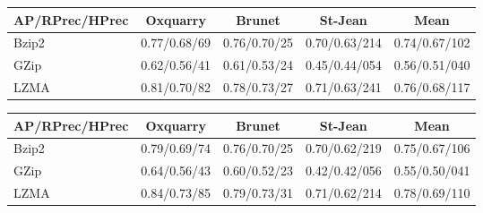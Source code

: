 \begin{table*}
  \centering
  \caption{Compression methods evaluation with different compression algorithm and distance metrics}
  \label{tab:compression_evaluation_results}

  \begin{tabular}{l c c c|c}
    \toprule
    AP/RPrec/HPrec & Oxquarry     & Brunet       & St-Jean       & Mean \\
    \midrule
    Bzip2          & 0.77/0.68/69 & 0.76/0.70/25 & 0.70/0.63/214 & 0.74/0.67/102\\
    GZip           & 0.62/0.56/41 & 0.61/0.53/24 & 0.45/0.44/054 & 0.56/0.51/040\\
    LZMA           & 0.81/0.70/82 & 0.78/0.73/27 & 0.71/0.63/241 & 0.76/0.68/117\\
    \bottomrule
  \end{tabular}

  \vspace{0.5cm}

  \begin{tabular}{l c c c|c}
    \toprule
    AP/RPrec/HPrec & Oxquarry     & Brunet       & St-Jean       & Mean\\
    \midrule
    Bzip2          & 0.79/0.69/74 & 0.76/0.70/25 & 0.70/0.62/219 & 0.75/0.67/106\\
    GZip           & 0.64/0.56/43 & 0.60/0.52/23 & 0.42/0.42/056 & 0.55/0.50/041\\
    LZMA           & 0.84/0.73/85 & 0.79/0.73/31 & 0.71/0.62/214 & 0.78/0.69/110\\
    \bottomrule
  \end{tabular}

\end{table*}

